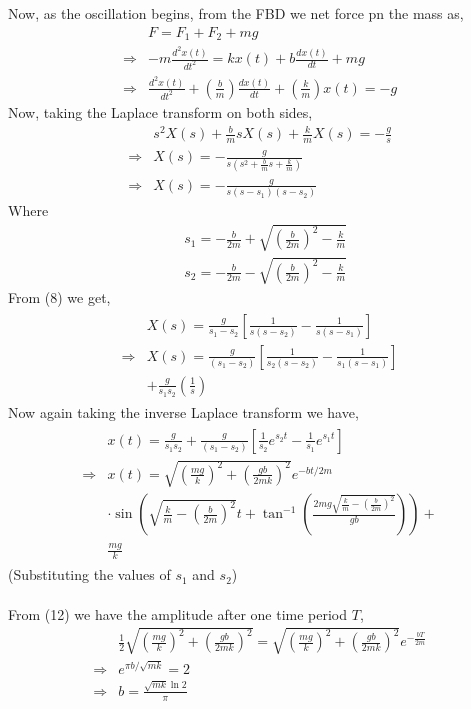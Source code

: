 \documentclass[journal,12pt,twocolumn]{IEEEtran}
\theoremstyle{remark}
\begin{document}
\begin{enumerate}
Now, as the oscillation begins, from the FBD we net force pn the mass as,
\begin{align}
    &F=F_{1}+F_{2}+mg\\
    \Rightarrow &-m\frac{d^2x(t)}{dt^2}=kx(t)+b\frac{dx(t)}{dt}+mg\\
    \Rightarrow &\frac{d^2x(t)}{dt^2}+\left(\frac{b}{m}\right)\frac{dx(t)}{dt}+\left(\frac{k}{m}\right)x(t)=-g
\end{align}
Now, taking the Laplace transform on both sides,
\begin{align}
&s^2X(s)+\frac{b}{m}sX(s)+\frac{k}{m}X(s)=-\frac{g}{s} \\
\Rightarrow &X(s)=-\frac{g}{s\left(s^2+\frac{b}{m}s+\frac{k}{m}\right)} \\
\Rightarrow &X(s)=-\frac{g}{s(s-s_1)(s-s_2)}
\end{align}
Where
\begin{align}
&s_1=-\frac{b}{2m}+\sqrt{\left(\frac{b}{2m}\right)^2-\frac{k}{m}} \\
&s_2=-\frac{b}{2m}-\sqrt{\left(\frac{b}{2m}\right)^2-\frac{k}{m}}
\end{align}
From (8) we get,
\begin{align}
\begin{split}
&X(s)=\frac{g}{s_1-s_2}\left[\frac{1}{s(s-s_2)}-\frac{1}{s(s-s_1)}\right] \\
\Rightarrow &X(s)=\frac{g}{(s_1-s_2)}\left[\frac{1}{s_2(s-s_2)}-\frac{1}{s_1(s-s_1)}\right] \\
&+\frac{g}{s_1s_2}\left(\frac{1}{s}\right)
\end{split}
\end{align}
Now again taking the inverse Laplace transform we have,
\begin{align}
\begin{split}
&x(t)=\frac{g}{s_1s_2}+\frac{g}{(s_1-s_2)}\left[\frac{1}{s_2}e^{s_2t}-\frac{1}{s_1}e^{s_1t}\right] \\
\Rightarrow &x(t)=\sqrt{\left(\frac{mg}{k}\right)^2+\left(\frac{gb}{2mk}\right)^2}e^{-bt/2m} \\
&\cdot\sin{\left(\sqrt{\frac{k}{m}-\left(\frac{b}{2m}\right)^2}t+\tan^{-1}\left(\frac{2mg\sqrt{\frac{k}{m}-\left(\frac{b}{2m}\right)^2}}{gb}\right)\right)}+ \\
&\frac{mg}{k}
\end{split}
\end{align}
(Substituting the values of $s_1$ and $s_2$) \\
\\
From (12) we have the amplitude after one time period $T$,
\begin{align}
&\frac{1}{2}\sqrt{\left(\frac{mg}{k}\right)^2+\left(\frac{gb}{2mk}\right)^2}=\sqrt{\left(\frac{mg}{k}\right)^2+\left(\frac{gb}{2mk}\right)^2}e^{-\frac{bT}{2m}} \\
\Rightarrow &e^{\pi b/\sqrt{mk}}=2 \\
\Rightarrow &b=\frac{\sqrt{mk}\ln{2}}{\pi}
\end{align}


\end{enumerate}
\end{document}
